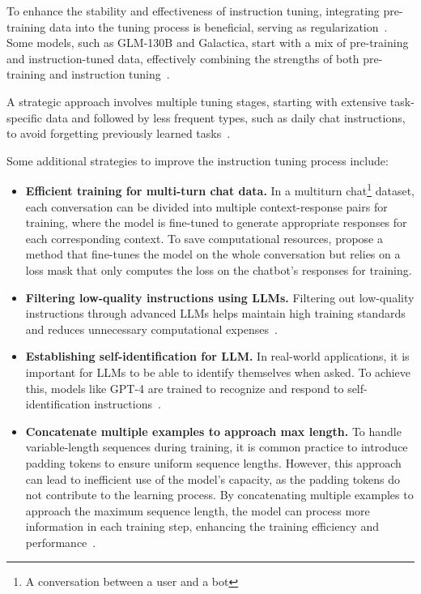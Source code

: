 To enhance the stability and effectiveness of instruction tuning, integrating pre-training data into the tuning process is beneficial, serving as regularization~\cite{wei2022fine}.
Some models, such as GLM-130B and Galactica, start with a mix of pre-training and instruction-tuned data, effectively combining the strengths of both pre-training and instruction tuning~\cite{chowdhery2022palm}.

A strategic approach involves multiple tuning stages, starting with extensive task-specific data and followed by less frequent types, such as daily chat instructions, to avoid forgetting previously learned tasks~\cite{raffel2023exploring}.

Some additional strategies to improve the instruction tuning process include:
\begin{itemize}
	\item \textbf{Efficient training for multi-turn chat data.} {In a multiturn chat\footnote{A conversation between a user and a bot} dataset, each conversation can be divided into multiple context-response pairs for training, where the model is fine-tuned to generate appropriate responses for each corresponding context. To save computational resources, \textcite{chiang2023vicuna} propose a method that fine-tunes the model on the whole conversation but relies on a loss mask that only computes the loss on the chatbot's responses for training.
	      }
	\item \textbf{Filtering low-quality instructions using LLMs.} {Filtering out low-quality instructions through advanced LLMs helps maintain high training standards and reduces unnecessary computational expenses~\cite{wei2022fine}.}
	\item \textbf{Establishing self-identification for LLM.} {In real-world applications, it is important for LLMs to be able to identify themselves when asked. To achieve this, models like GPT-4 are trained to recognize and respond to self-identification instructions~\cite{radford2023gpt4}.
	      }
	\item \textbf{Concatenate multiple examples to approach max length.} {
		      To handle variable-length sequences during training, it is common practice to introduce padding tokens to ensure uniform sequence lengths. However, this approach can lead to inefficient use of the model's capacity, as the padding tokens do not contribute to the learning process. By concatenating multiple examples to approach the maximum sequence length, the model can process more information in each training step, enhancing the training efficiency and performance~\cite{krell2021efficient}.
}
\end{itemize}
